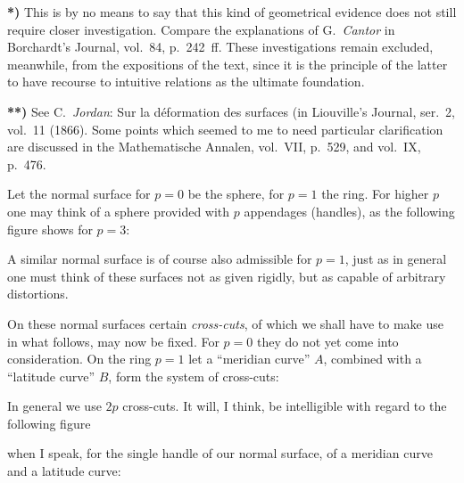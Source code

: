 \documentclass{article}
\begin{document}
\textbf{*)} This is by no means to say that this kind of geometrical evidence does not still require closer investigation. Compare the explanations of G.\ \emph{Cantor} in Borchardt's Journal, vol.~84, p.~242~ff. These investigations remain excluded, meanwhile, from the expositions of the text, since it is the principle of the latter to have recourse to intuitive relations as the ultimate foundation.

\textbf{**)} See C.\ \emph{Jordan}: Sur la déformation des surfaces (in Liouville's Journal, ser.~2, vol.~11 (1866). Some points which seemed to me to need particular clarification are discussed in the Mathematische Annalen, vol.~VII, p.~529, and vol.~IX, p.~476.


Let the normal surface for $p = 0$ be the sphere, for $p = 1$ the ring. For higher $p$ one may think of a sphere provided with $p$ appendages (handles), as the following figure shows for $p = 3$:


A similar normal surface is of course also admissible for $p = 1$, just as in general one must think of these surfaces not as given rigidly, but as capable of arbitrary distortions.

On these normal surfaces certain \emph{cross-cuts}, of which we shall have to make use in what follows, may now be fixed. For $p = 0$ they do not yet come into consideration. On the ring $p = 1$ let a “meridian curve” $A$, combined with a “latitude curve” $B$, form the system of cross-cuts:


In general we use $2p$ cross-cuts. It will, I think, be intelligible with regard to the following figure

when I speak, for the single handle of our normal surface, of a meridian curve and a latitude curve:

\end{document}
